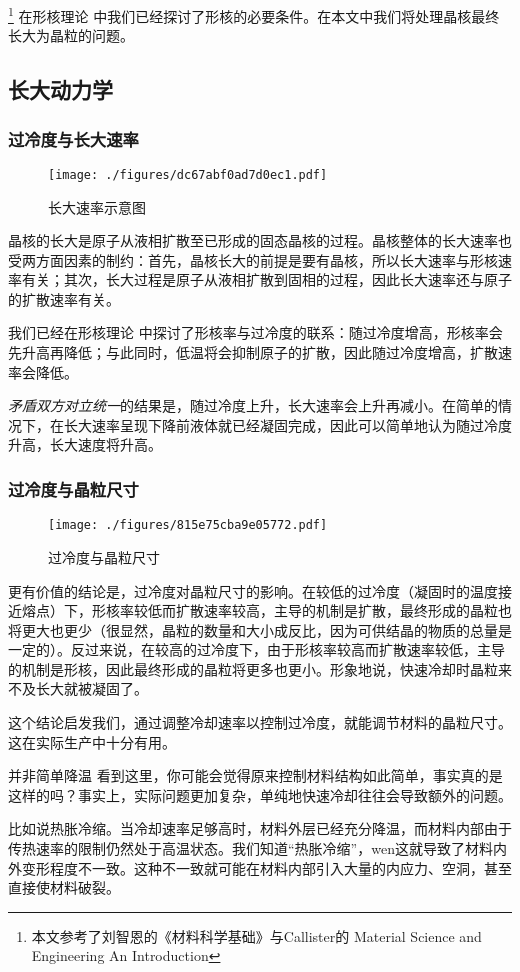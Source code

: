 
\footnote{本文参考了刘智恩的《材料科学基础》与Callister的 Material Science and Engineering An Introduction} 在形核理论  中我们已经探讨了形核的必要条件。在本文中我们将处理晶核最终长大为晶粒的问题。

\subsection{长大动力学}
\subsubsection{过冷度与长大速率}
\begin{figure}[ht]
\centering
\texttt{[image: ./figures/dc67abf0ad7d0ec1.pdf]}
\caption{长大速率示意图} \label{fig_GGRW_1}
\end{figure}

晶核的长大是原子从液相扩散至已形成的固态晶核的过程。晶核整体的长大速率也受两方面因素的制约：首先，晶核长大的前提是要有晶核，所以长大速率与形核速率有关；其次，长大过程是原子从液相扩散到固相的过程，因此长大速率还与原子的扩散速率有关。

我们已经在形核理论  中探讨了形核率与过冷度的联系：随过冷度增高，形核率会先升高再降低；与此同时，低温将会抑制原子的扩散，因此随过冷度增高，扩散速率会降低。

\textsl{矛盾双方对立统一}的结果是，随过冷度上升，长大速率会上升再减小。在简单的情况下，在长大速率呈现下降前液体就已经凝固完成，因此可以简单地认为随过冷度升高，长大速度将升高。

\subsubsection{过冷度与晶粒尺寸}
\begin{figure}[ht]
\centering
\texttt{[image: ./figures/815e75cba9e05772.pdf]}
\caption{过冷度与晶粒尺寸} \label{fig_GGRW_fig2}
\end{figure}
更有价值的结论是，过冷度对晶粒尺寸的影响。在较低的过冷度（凝固时的温度接近熔点）下，形核率较低而扩散速率较高，主导的机制是扩散，最终形成的晶粒也将更大也更少（很显然，晶粒的数量和大小成反比，因为可供结晶的物质的总量是一定的）。反过来说，在较高的过冷度下，由于形核率较高而扩散速率较低，主导的机制是形核，因此最终形成的晶粒将更多也更小。形象地说，快速冷却时晶粒来不及长大就被凝固了。

这个结论启发我们，通过调整冷却速率以控制过冷度，就能调节材料的晶粒尺寸。这在实际生产中十分有用。

\begin{example}{并非简单降温}
看到这里，你可能会觉得原来控制材料结构如此简单，事实真的是这样的吗？事实上，实际问题更加复杂，单纯地快速冷却往往会导致额外的问题。

比如说热胀冷缩。当冷却速率足够高时，材料外层已经充分降温，而材料内部由于传热速率的限制仍然处于高温状态。我们知道“热胀冷缩”，wen这就导致了材料内外变形程度不一致。这种不一致就可能在材料内部引入大量的内应力、空洞，甚至直接使材料破裂。
\end{example}
